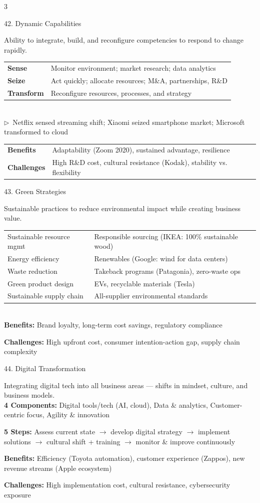 \documentclass[7.5pt, letterpaper]{article}
\newcommand{\concept}[1]{%
  \vspace{2.5pt}%
  \noindent\colorbox{accent}{\parbox{\dimexpr\linewidth-2\fboxsep}{\fontsize{6.8pt}{7.5pt}\selectfont\bfseries\color{white}\strut #1\strut}}%
  \vspace{1pt}\par%
}
\newcommand{\kv}[2]{\noindent\textbf{#1:} #2\par}
\newcommand{\bul}[1]{\noindent$\triangleright$\ #1\par}
\newcommand{\minitab}[1]{%
  \begingroup
  \fontsize{6.2pt}{7pt}\selectfont
  \setlength{\tabcolsep}{2pt}
  #1
  \endgroup
}
\begin{document}
\begin{multicols}{3}
\concept{42. Dynamic Capabilities}
Ability to integrate, build, and reconfigure competencies to respond to change rapidly.\\
\minitab{\begin{tabular}{@{}ll@{}}
\textbf{Sense} & Monitor environment; market research; data analytics\\
\textbf{Seize} & Act quickly; allocate resources; M\&A, partnerships, R\&D\\
\textbf{Transform} & Reconfigure resources, processes, and strategy\\
\end{tabular}}\\
\bul{Netflix sensed streaming shift; Xiaomi seized smartphone market; Microsoft transformed to cloud}
\minitab{\begin{tabular}{@{}ll@{}}
\textbf{Benefits} & Adaptability (Zoom 2020), sustained advantage, resilience\\
\textbf{Challenges} & High R\&D cost, cultural resistance (Kodak), stability vs. flexibility\\
\end{tabular}}

\concept{43. Green Strategies}
Sustainable practices to reduce environmental impact while creating business value.\\
\minitab{\begin{tabular}{@{}ll@{}}
Sustainable resource mgmt & Responsible sourcing (IKEA: 100\% sustainable wood)\\
Energy efficiency & Renewables (Google: wind for data centers)\\
Waste reduction & Takeback programs (Patagonia), zero-waste ops\\
Green product design & EVs, recyclable materials (Tesla)\\
Sustainable supply chain & All-supplier environmental standards\\
\end{tabular}}\\
\kv{Benefits}{Brand loyalty, long-term cost savings, regulatory compliance}
\kv{Challenges}{High upfront cost, consumer intention-action gap, supply chain complexity}

\concept{44. Digital Transformation}
Integrating digital tech into all business areas --- shifts in mindset, culture, and business models.\\
\kv{4 Components}{Digital tools/tech (AI, cloud), Data \& analytics, Customer-centric focus, Agility \& innovation}
\kv{5 Steps}{Assess current state $\to$ develop digital strategy $\to$ implement solutions $\to$ cultural shift + training $\to$ monitor \& improve continuously}
\kv{Benefits}{Efficiency (Toyota automation), customer experience (Zappos), new revenue streams (Apple ecosystem)}
\kv{Challenges}{High implementation cost, cultural resistance, cybersecurity exposure}


\end{multicols}
\end{document}
